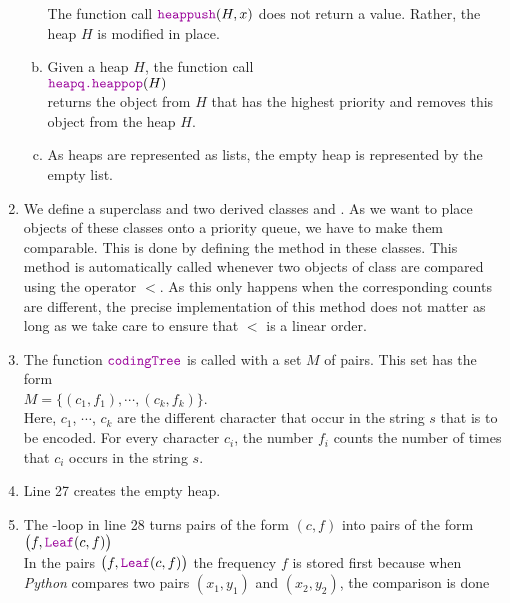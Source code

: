 \begin{enumerate}
\begin{enumerate}[(a)]
            The function call $\mytt{heappush}(H, x)$ does not return a value.  Rather, the heap $H$ is
            modified in place.
      \item Given a heap $H$, the function call
            \\[0.2cm]
            \hspace*{1.3cm}
            $\mytt{heapq.heappop}(H)$
            \\[0.2cm]
            returns the object from $H$ that has the highest priority and removes this object from the heap
            $H$.
      \item As heaps are represented as lists, the empty heap is represented by the empty list.
      \end{enumerate}
\item We define a superclass  and two derived classes  and .
      As we want to place objects of these classes onto a priority queue, we have to make them comparable.
      This is done by defining the method  in these classes.  This method is automatically 
      called whenever two objects of class  are compared using the operator $<$.
      As this only happens when the corresponding counts are different, the precise implementation of this
      method does not matter as long as we take care to ensure that $<$ is a linear order.
\item The function $\mytt{codingTree}$ is called with a set  $M$ of pairs.  This set has the form
      \\[0.2cm]
      \hspace*{1.3cm}
      $M = \bigl\{ (c_1, f_1), \cdots, (c_k, f_k) \bigr\}$.
      \\[0.2cm]
      Here, $c_1$, $\cdots$, $c_k$ are the different character that occur in the string $s$ that is to be encoded. 
      For every character $c_i$, the number $f_i$ counts the number of times that $c_i$ occurs in the string
      $s$.
\item Line 27 creates the empty heap.
\item The -loop in line 28 turns pairs of the form $(c, f)$ into pairs of the form
      \\[0.2cm]
      \hspace*{1.3cm}
      $\bigl(f, \mytt{Leaf}(c, f)\bigr)$
      \\[0.2cm]
      In the pairs $\bigl(f, \mytt{Leaf}(c, f)\bigr)$ the frequency $f$ is stored first because
      when \textsl{Python} compares two pairs $(x_1, y_1)$ and $(x_2, y_2)$, the comparison is done

\end{enumerate}
